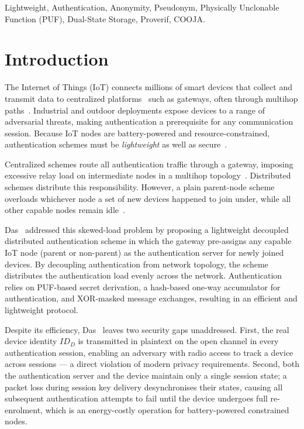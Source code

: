 \documentclass[conference]{IEEEtran}
\begin{document}
\begin{IEEEkeywords}
Lightweight, Authentication, Anonymity, Pseudonym, Physically
Unclonable Function (PUF), Dual-State Storage, Proverif, COOJA.
\end{IEEEkeywords}

\section{Introduction}

The Internet of Things (IoT) connects millions of smart devices that collect
and transmit data to centralized platforms~\cite{zhou2021iot}
such as gateways, often through multihop paths~\cite{lajnef2022wsn}.
Industrial and outdoor deployments expose devices to a range of adversarial
threats, making authentication a prerequisite for any communication session.
Because IoT nodes are battery-powered and resource-constrained,
authentication schemes must be \emph{lightweight} as well as
secure~\cite{khatua2024puf}.

Centralized schemes route all authentication traffic through a gateway,
imposing excessive relay load on intermediate nodes in a multihop
topology~\cite{sheik2023auth}\cite{he2023lightweight}\cite{roy2025design}.  Distributed
schemes distribute this responsibility. However, a plain parent-node scheme
overloads whichever node a set of new devices happened to join under, while
all other capable nodes remain idle~\cite{rosa2023lightsae}.

Das~\cite{das2026comsnets} addressed this skewed-load problem by proposing a
lightweight decoupled distributed authentication scheme in which the gateway
pre-assigns any capable IoT node (parent or non-parent) as the
authentication server for newly joined devices.  By decoupling authentication
from network topology, the scheme distributes the authentication load evenly
across the network.  Authentication relies on PUF-based secret derivation, a
hash-based one-way accumulator for authentication, and
XOR-masked message exchanges, resulting in an efficient and lightweight
protocol.

Despite its efficiency, Das~\cite{das2026comsnets} leaves two security gaps
unaddressed.  First, the real device identity $ID_D$ is transmitted in
plaintext on the open channel in every authentication session, enabling an
adversary with radio access to track a device across sessions — a direct
violation of modern privacy requirements.  Second, both the authentication
server and the device maintain only a single session state; a packet loss
during session key delivery desynchronises their states, causing all
subsequent authentication attempts to fail until the device undergoes full
re-enrolment, which is an energy-costly operation for battery-powered
constrained nodes.
\end{document}
